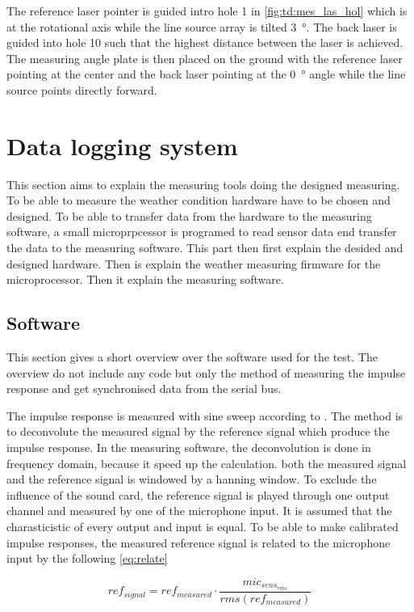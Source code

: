The reference laser pointer is guided intro hole 1 in \autoref{fig:td:mes_las_hol} which is at the rotational axis while the line source array is tilted \SI{3}{\degree}. The back laser is guided into hole 10 such that the highest distance between the laser is achieved. The measuring angle plate is then placed on the ground with the reference laser pointing at the center and the back laser pointing at the \SI{0}{\degree} angle while the line source points directly forward. 




\section{Data logging system} 
This section aims to explain the measuring tools doing the designed measuring. To be able to measure the weather condition hardware have to be chosen and designed. To be able to transfer data from the hardware to the measuring software, a small microprpcessor is programed to read sensor data end transfer the data to the measuring software. This part then first explain the desided and designed hardware. Then is explain the weather measuring firmware for the microprocessor. Then it explain the measuring software. 

\subsection{Software}
This section gives a short overview over the \matlab software used for the test. The overview do not include any code but only the method of measuring the impulse response and get synchronised data from the serial bus. 

The impulse response is measured with sine sweep according to \citep{}. The method is to deconvolute the measured signal by the reference signal which produce the impulse response. In the measuring software, the deconvolution is done in frequency domain, because it speed up the calculation. both the measured signal and the reference signal is windowed by a hanning window. To exclude the influence of the sound card, the reference signal is played through one output channel and measured by one of the microphone input. It is assumed that the charasticistic of every output and input is equal. To be able to make calibrated impulse responses, the measured reference signal is related to the microphone input by the following \autoref{eq:relate}

\begin{equation}\label{eq:relate}
ref_{signal} = ref_{measured} \cdot    \frac{mic_{sens_{rms}}}{rms(ref_{measured})}
\end{equation}

